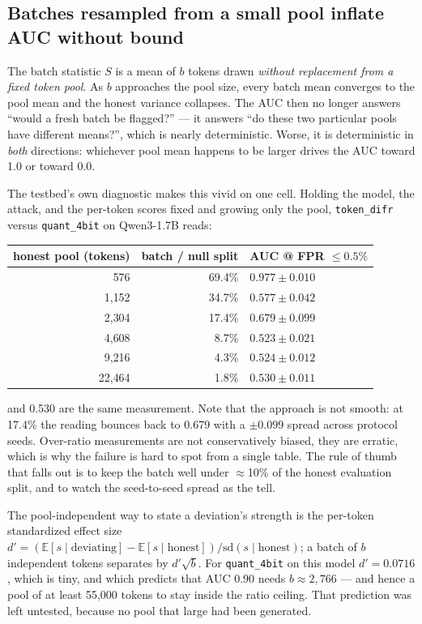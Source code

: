 \documentclass[11pt]{article}
\newcommand{\td}{\texttt{token\_difr}}
\begin{document}
\subsection{Batches resampled from a small pool inflate AUC without bound}

The batch statistic $S$ is a mean of $b$ tokens drawn \emph{without replacement from
a fixed token pool}. As $b$ approaches the pool size, every batch mean converges to
the pool mean and the honest variance collapses. The AUC then no longer answers
``would a fresh batch be flagged?'' --- it answers ``do these two particular pools
have different means?'', which is nearly deterministic. Worse, it is deterministic
in \emph{both} directions: whichever pool mean happens to be larger drives the AUC
toward 1.0 or toward 0.0.

The testbed's own diagnostic makes this vivid on one cell. Holding the model, the
attack, and the per-token scores fixed and growing only the pool, \td{} versus
\texttt{quant\_4bit} on Qwen3-1.7B reads:

\begin{center}\small
\begin{tabular}{rrl}
\toprule
honest pool (tokens) & batch / null split & AUC @ FPR $\le 0.5\%$ \\
\midrule
576    & 69.4\% & $0.977 \pm 0.010$ \\
1{,}152  & 34.7\% & $0.577 \pm 0.042$ \\
2{,}304  & 17.4\% & $0.679 \pm 0.099$ \\
4{,}608  & 8.7\%  & $0.523 \pm 0.021$ \\
9{,}216  & 4.3\%  & $0.524 \pm 0.012$ \\
22{,}464 & 1.8\%  & $0.530 \pm 0.011$ \\
\bottomrule
\end{tabular}
\end{center}

 and 0.530 are the same measurement. Note that the approach is not
smooth: at 17.4\% the reading bounces back to 0.679 with a $\pm 0.099$ spread across
protocol seeds. Over-ratio measurements are not conservatively biased, they are
erratic, which is why the failure is hard to spot from a single table. The rule of
thumb that falls out is to keep the batch well under $\approx$10\% of the honest
evaluation split, and to watch the seed-to-seed spread as the tell.

The pool-independent way to state a deviation's strength is the per-token
standardized effect size $d' = (\mathbb{E}[s \mid \text{deviating}] -
\mathbb{E}[s \mid \text{honest}]) / \mathrm{sd}(s \mid \text{honest})$; a batch of
$b$ independent tokens separates by $d'\sqrt{b}$. For \texttt{quant\_4bit} on this
model $d' = 0.0716$, which is tiny, and which predicts that AUC 0.90 needs
$b \approx 2{,}766$ --- and hence a pool of at least 55{,}000 tokens to stay inside
the ratio ceiling. That prediction was left untested, because no pool that large had
been generated.
\end{document}
